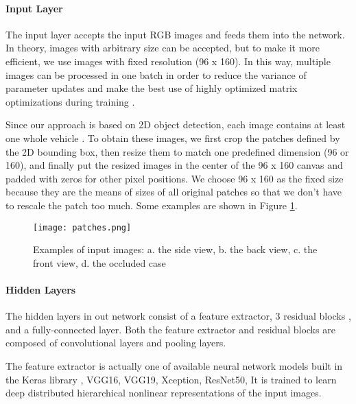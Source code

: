 \paragraph{Input Layer}
The input layer accepts the input RGB images and feeds them into the network. In theory, images with arbitrary size can be accepted, but to make it more efficient, we use images with fixed resolution (96 x 160).  In this way, multiple images can be processed in one batch in order to reduce the variance of parameter updates and make the best use of highly optimized matrix optimizations during training \cite{DBLP:journals/corr/Ruder16}.

Since our approach is based on 2D object detection, each image contains at least one whole vehicle . To obtain these images, we first crop the patches defined by the 2D bounding box, then resize them to match one predefined dimension (96 or 160), and finally put the resized images in the center of the 96 x 160 canvas and padded with zeros for other pixel positions. We choose 96 x 160 as the fixed size because they are the means of sizes of all original patches so that we don't have to rescale the patch too much.  Some examples are shown in Figure \ref{figure:patches}.

\begin{figure}[h]		
	\texttt{[image: patches.png]}
	\caption{Examples of input images: a. the side view, b. the back view, c. the front view, d. the occluded case}
	\centering
	\label{figure:patches}
\end{figure}

\paragraph{Hidden Layers}
The hidden layers in out network consist of a feature extractor, 3 residual blocks \cite{DBLP:journals/corr/HeZRS15}, and a fully-connected layer. Both the feature extractor and residual blocks are composed of convolutional layers and pooling layers.

The feature extractor is actually one of available neural network models built in the Keras library \cite{chollet2015keras}, \ie VGG16, VGG19, Xception, ResNet50, \etc It is trained to  learn deep distributed hierarchical nonlinear representations of the input images.

